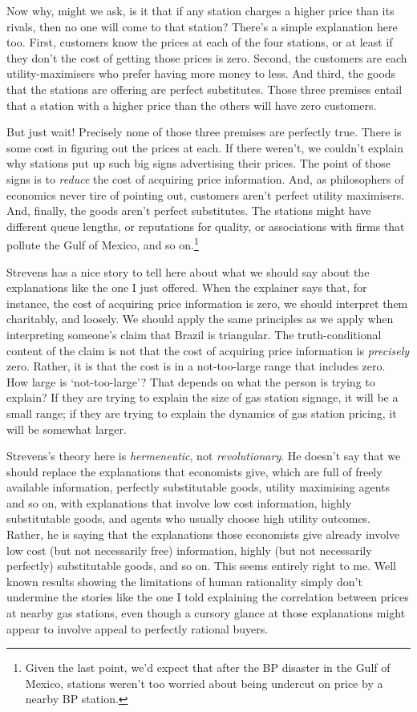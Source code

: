 \documentclass[
  11pt,
  letterpaper,
  DIV=11,
  numbers=noendperiod,
  twoside]{scrartcl}
\begin{document}
Now why, might we ask, is it that if any station charges a higher price
than its rivals, then no one will come to that station? There's a simple
explanation here too. First, customers know the prices at each of the
four stations, or at least if they don't the cost of getting those
prices is zero. Second, the customers are each utility-maximisers who
prefer having more money to less. And third, the goods that the stations
are offering are perfect substitutes. Those three premises entail that a
station with a higher price than the others will have zero customers.

But just wait! Precisely none of those three premises are perfectly
true. There is some cost in figuring out the prices at each. If there
weren't, we couldn't explain why stations put up such big signs
advertising their prices. The point of those signs is to \emph{reduce}
the cost of acquiring price information. And, as philosophers of
economics never tire of pointing out, customers aren't perfect utility
maximisers. And, finally, the goods aren't perfect substitutes. The
stations might have different queue lengths, or reputations for quality,
or associations with firms that pollute the Gulf of Mexico, and so
on.\footnote{Given the last point, we'd expect that after the BP
  disaster in the Gulf of Mexico, stations weren't too worried about
  being undercut on price by a nearby BP station.}

Strevens has a nice story to tell here about what we should say about
the explanations like the one I just offered. When the explainer says
that, for instance, the cost of acquiring price information is zero, we
should interpret them charitably, and loosely. We should apply the same
principles as we apply when interpreting someone's claim that Brazil is
triangular. The truth-conditional content of the claim is not that the
cost of acquiring price information is \emph{precisely} zero. Rather, it
is that the cost is in a not-too-large range that includes zero. How
large is `not-too-large'? That depends on what the person is trying to
explain? If they are trying to explain the size of gas station signage,
it will be a small range; if they are trying to explain the dynamics of
gas station pricing, it will be somewhat larger.

Strevens's theory here is \emph{hermeneutic}, not \emph{revolutionary}.
He doesn't say that we should replace the explanations that economists
give, which are full of freely available information, perfectly
substitutable goods, utility maximising agents and so on, with
explanations that involve low cost information, highly substitutable
goods, and agents who usually choose high utility outcomes. Rather, he
is saying that the explanations those economists give already involve
low cost (but not necessarily free) information, highly (but not
necessarily perfectly) substitutable goods, and so on. This seems
entirely right to me. Well known results showing the limitations of
human rationality simply don't undermine the stories like the one I told
explaining the correlation between prices at nearby gas stations, even
though a cursory glance at those explanations might appear to involve
appeal to perfectly rational buyers.
\end{document}
